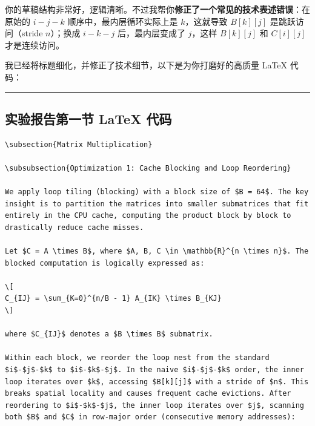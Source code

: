 \documentclass[11pt, a4paper]{article}
\begin{document}
\begin{aibox}
你的草稿结构非常好，逻辑清晰。不过我帮你\textbf{修正了一个常见的技术表述错误}：在原始的 $i-j-k$ 顺序中，最内层循环实际上是 $k$，这就导致 $B[k][j]$ 是跳跃访问（stride $n$）；换成 $i-k-j$ 后，最内层变成了 $j$，这样 $B[k][j]$ 和 $C[i][j]$ 才是连续访问。

我已经将标题细化，并修正了技术细节，以下是为你打磨好的高质量 LaTeX 代码：

\begin{center}\rule{\textwidth}{0.4pt}\end{center}

\subsection*{实验报告第一节 LaTeX 代码}

\begin{tcolorbox}[colback=white,colframe=gray!50!white,boxrule=0.5pt,arc=2pt,left=5pt,right=5pt,top=5pt,bottom=5pt]
\begin{verbatim}
\subsection{Matrix Multiplication}

\subsubsection{Optimization 1: Cache Blocking and Loop Reordering}

We apply loop tiling (blocking) with a block size of $B = 64$. The key insight is to partition the matrices into smaller submatrices that fit entirely in the CPU cache, computing the product block by block to drastically reduce cache misses.

Let $C = A \times B$, where $A, B, C \in \mathbb{R}^{n \times n}$. The blocked computation is logically expressed as:

\[
C_{IJ} = \sum_{K=0}^{n/B - 1} A_{IK} \times B_{KJ}
\]

where $C_{IJ}$ denotes a $B \times B$ submatrix.

Within each block, we reorder the loop nest from the standard $i$-$j$-$k$ to $i$-$k$-$j$. In the naive $i$-$j$-$k$ order, the inner loop iterates over $k$, accessing $B[k][j]$ with a stride of $n$. This breaks spatial locality and causes frequent cache evictions. After reordering to $i$-$k$-$j$, the inner loop iterates over $j$, scanning both $B$ and $C$ in row-major order (consecutive memory addresses):


\end{verbatim}
\end{tcolorbox}
\end{aibox}
\end{document}
